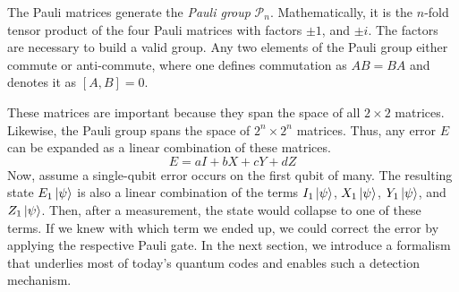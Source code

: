 The Pauli matrices generate the \textit{Pauli group} $\mathcal{P}_{n}$. Mathematically, it is the $n$-fold tensor product of the four Pauli matrices with factors $\pm{}1$, and $\pm{}i$. The factors are necessary to build a valid group. Any two elements of the Pauli group either commute or anti-commute, where one defines commutation as $AB = BA$ and denotes it as ${[A, B] = 0}$. 

These matrices are important because they span the space of all $2 \times 2$ matrices. Likewise, the Pauli group spans the space of $2^{n}\times 2^{n}$ matrices. Thus, any error $E$ can be expanded as a linear combination of these matrices.
\begin{equation}
    E = aI + bX + cY + dZ
\end{equation}
Now, assume a single-qubit error occurs on the first qubit of many. The resulting state $E_{1}\ket{\psi}$ is also a linear combination of the terms $I_{1}\ket{\psi}$, $X_{1}\ket{\psi}$, $Y_{1}\ket{\psi}$, and $Z_{1}\ket{\psi}$. Then, after a measurement, the state would collapse to one of these terms. If we knew with which term we ended up, we could correct the error by applying the respective Pauli gate. In the next section, we introduce a formalism that underlies most of today's quantum codes and enables such a detection mechanism.
